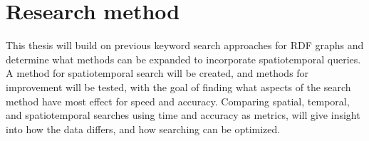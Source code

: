 \section{Research method}
\label{sec:researchMethod}
This thesis will build on previous keyword search approaches for RDF graphs and determine what methods can be expanded to incorporate spatiotemporal queries. A method for spatiotemporal search will be created, and methods for improvement will be tested, with the goal of finding what aspects of the search method have most effect for speed and accuracy. Comparing spatial, temporal, and spatiotemporal searches using time and accuracy as metrics, will give insight into how the data differs, and how searching can be optimized.

\glsresetall